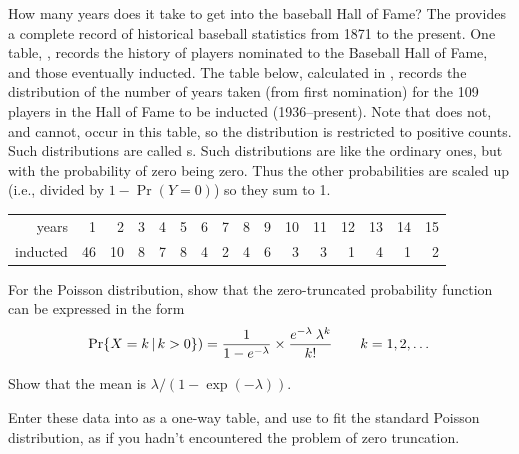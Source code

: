 \documentclass[10pt,krantz2]{krantz}\usepackage[]{graphicx}\usepackage[]{color}
\begin{document}
\begin{Exercises}
\exercise \hard How many years does it take to get into the baseball Hall of Fame?
  The  provides a complete record of historical baseball statistics from 1871 to
  the present.  One table, , records the history of players nominated to
  the Baseball Hall of Fame, and those eventually inducted.  The table below, calculated
  in , records the distribution of the number of years
  taken (from first nomination)
  for the 109 players in the Hall of Fame to be inducted (1936--present).
  Note that  does not, and cannot, occur in this table, so the distribution
  is restricted to positive counts.  Such distributions are called s.
  Such distributions are like the ordinary ones, but with the probability of zero being zero.
  Thus the other probabilities are scaled up (i.e., divided by $1-\Pr(Y=0)$) so they sum to 1.

\begin{tabular}{rrrrrrrrrrrrrrrr}
  \hline
years    & 1 & 2 & 3 & 4 & 5 & 6 & 7 & 8 & 9 & 10 & 11 & 12 & 13 & 14 & 15 \\
inducted &  46 &  10 &   8 &   7 &   8 &   4 &   2 &   4 &   6 &   3 &   3 &   1 &   4 &   1 &   2 \\
   \hline
\end{tabular}

    \begin{enumerate*}
      \item For the Poisson distribution, show that the zero-truncated probability function can be expressed in the
      form
\begin{equation*}
\Pr \{ X = k \, | \, k>0\} )=
  \frac{1}{1-e^{-\lambda}} \times
  \frac{ e^{ - \lambda } \:  \lambda^k } { k ! }
  \quad\quad k = 1, 2, \dots
\end{equation*}

      \item Show that the mean is $\lambda/(1-\exp(-\lambda))$.
      \item Enter these data into \R as a one-way table, and use  to fit the standard
      Poisson distribution, as if you hadn't encountered the problem of zero truncation.

    \end{enumerate*}


\end{Exercises}
\end{document}
